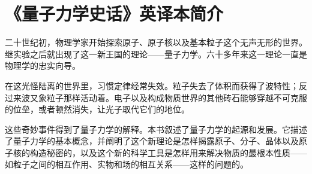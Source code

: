 \chapter{《量子力学史话》英译本简介}

二十世纪初，物理学家开始探索原子、原子核以及基本粒子这个无声无形的世界。继实验之后就出现了这一新王国的理论——量子力学。六十多年来这一理论一直是物理学的忠实向导。

在这光怪陆离的世界里，习惯定律经常失效。粒子失去了体积而获得了波特性；反过来波又象粒子那样活动着。电子以及构成物质世界的其他砖石能够穿越不可克服的位垒，或者顿然消失，让光子取代它们的地位。

这些奇妙事件得到了量子力学的解释。本书叙述了量子力学的起源和发展。它描述了量子力学的基本概念，并阐明了这个新理论是怎样揭露原子、分子、晶体以及原子核的构造秘密的，以及这个新的科学工具是怎样用来解决物质的最根本性质——如粒子之间的相互作用、实物和场的相互关系——这样的问题的。
